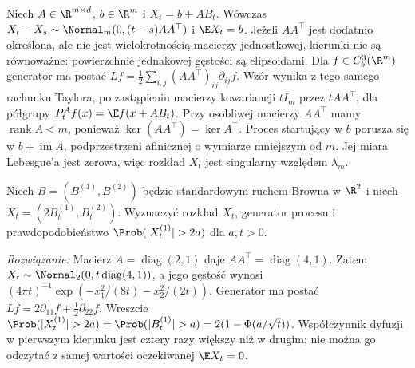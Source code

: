 \begin{przyklad}
Niech $A\in\R^{m\times d}$, $b\in\R^m$ i $X_t=b+AB_t$.
Wówczas $X_t-X_s\sim\Normal_m(0,(t-s)AA^\top)$ i
$\E X_t=b$. Jeżeli $AA^\top$ jest dodatnio określona, ale nie jest wielokrotnością
macierzy jednostkowej, kierunki nie są równoważne: powierzchnie
jednakowej gęstości są elipsoidami. Dla
$f\in C_b^3(\R^m)$ generator ma postać
$Lf=\frac12\sum_{i,j}(AA^\top)_{ij}\partial_{ij}f$.
Wzór wynika z tego samego rachunku Taylora, po zastąpieniu
macierzy kowariancji $tI_m$ przez $tAA^\top$, dla półgrupy
$P_t^Af(x)=\E f(x+AB_t)$. Przy osobliwej macierzy
$AA^\top$ mamy $\operatorname{rank} A<m$, ponieważ
$\ker(AA^\top)=\ker A^\top$. Proces startujący w $b$
porusza się w $b+\operatorname{im}A$, podprzestrzeni
afinicznej o wymiarze mniejszym od $m$. Jej miara
Lebesgue'a jest zerowa, więc rozkład $X_t$ jest singularny
względem $\lambda_m$.
\end{przyklad}


\begin{zadanie}
Niech $B=(B^{(1)},B^{(2)})$ będzie standardowym ruchem Browna
w $\R^2$ i niech $X_t=(2B_t^{(1)},B_t^{(2)})$.
Wyznaczyć rozkład $X_t$, generator procesu i prawdopodobieństwo
$\Prob(|X_t^{(1)}|>2a)$ dla $a,t>0$.

\emph{Rozwiązanie.} Macierz $A=\operatorname{diag}(2,1)$ daje
$AA^\top=\operatorname{diag}(4,1)$. Zatem
$X_t\sim\Normal_2(0,t\operatorname{diag}(4,1))$,
a jego gęstość wynosi
$ (4\pi t)^{-1}\exp(-x_1^2/(8t)-x_2^2/(2t))$.
Generator ma postać $Lf=2\partial_{11}f+\tfrac12\partial_{22}f$.
Wreszcie
$\Prob(|X_t^{(1)}|>2a)=\Prob(|B_t^{(1)}|>a)
=2(1-\Phi(a/\sqrt t))$.
Współczynnik dyfuzji w pierwszym kierunku jest cztery razy
większy niż w drugim; nie można go odczytać z samej
wartości oczekiwanej $\E X_t=0$.
\end{zadanie}

